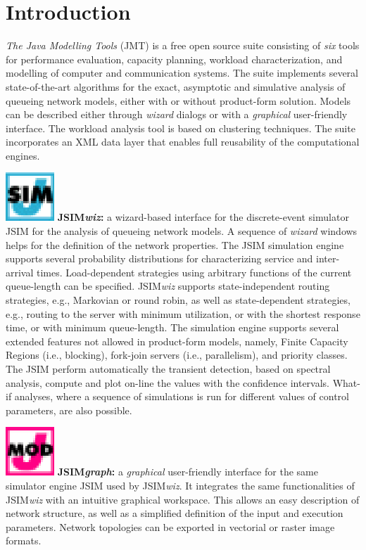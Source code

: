 \chapter{Introduction}
\emph{The Java Modelling Tools} (JMT) is a free open source suite
consisting of \emph{six} tools  for performance evaluation,
capacity planning, workload characterization, and modelling of
computer and communication systems. The suite implements several
state-of-the-art algorithms for the exact, asymptotic and
simulative analysis of queueing network models, either with or
without product-form solution. Models can be described either
through \emph{wizard} dialogs or with a \emph{graphical}
user-friendly interface. The workload analysis tool is based on
clustering techniques. The suite incorporates an XML data layer
that enables full reusability of the computational engines.

\medskip \noindent \includegraphics[scale=.5]{img/JSIMIcon}
\textbf{JSIM\emph{wiz}:} a wizard-based interface for the
discrete-event simulator JSIM for the analysis of queueing network
models. A sequence of \emph{wizard} windows helps for the
definition of the network properties. The JSIM simulation engine
supports several probability distributions for characterizing
service and inter-arrival times. Load-dependent strategies using
arbitrary functions of the current queue-length can be specified.
JSIM\emph{wiz} supports state-independent routing strategies,
e.g., Markovian or round robin, as well as state-dependent
strategies, e.g., routing to the server with minimum utilization,
or with the shortest response time, or with minimum queue-length.
The simulation engine supports several extended features not
allowed in product-form models, namely, Finite Capacity Regions
(i.e., blocking), fork-join servers (i.e., parallelism), and
priority classes. The JSIM perform automatically the transient
detection, based on spectral analysis, compute and plot on-line
the values with the confidence intervals. What-if analyses, where
a sequence of simulations is run for different values of control
parameters, are also possible.

\medskip \noindent \includegraphics[scale=.5]{img/JMODELIcon}
\textbf{JSIM\emph{graph}:} a \emph{graphical} user-friendly
interface for the same simulator engine JSIM used by
JSIM\emph{wiz}. It integrates the same functionalities of
JSIM\emph{wiz} with an intuitive graphical workspace. This allows
an easy description of network structure, as well as a simplified
definition of the input and execution parameters. Network
topologies can be exported in vectorial or raster image formats.

